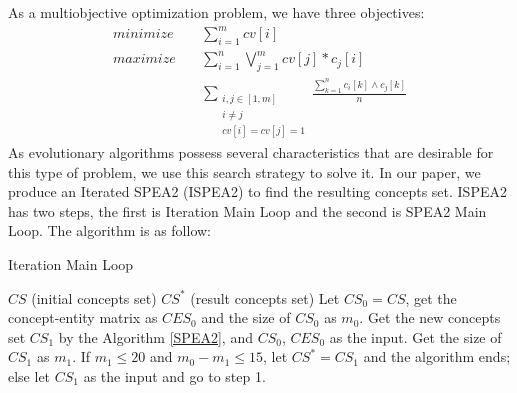 As a multiobjective optimization problem, we have three objectives:
\begin{eqnarray}
minimize\ && \sum_{i=1}^m cv[i]\\
maximize\ && \sum_{i=1}^{n}{\bigvee_{j=1}^{m}{cv[j]*c_{j}[i]}}\\
&& \sum_{\substack{i,j \in [1,m]\\i \neq j\\cv[i] = cv[j] = 1}}{\frac{\sum_{k=1}^n{c_i[k] \wedge c_j[k]}}{n}}
\end{eqnarray}
As evolutionary algorithms possess several characteristics that are desirable for this type of problem\cite{zitzler2004tutorial},
we use this search strategy to solve it.
In our paper, we produce an Iterated SPEA2 (ISPEA2) to find the resulting concepts set. ISPEA2 has two steps, the first is Iteration Main Loop and the second is SPEA2 Main Loop\cite{zitzler2001spea2}. The algorithm is as follow:
\begin{algorithm}
\caption{Iteration Main Loop}
\label{Iteration}
\begin{algorithmic}[1]
\Require
$CS$ (initial concepts set)
\Ensure $CS^*$ (result concepts set)
\State Let $CS_0 = CS$, get the concept-entity matrix as $CES_0$ and the size of $CS_0$ as $m_0$.
\State Get the new concepts set $CS_1$ by the Algorithm \ref{SPEA2}, and $CS_0$, $CES_0$ as the input.
\State Get the size of $CS_1$ as $m_1$. If $m_1 \leq 20$ and $m_0 - m_1 \leq 15$, let $CS^* = CS_1$ and the algorithm ends; else let $CS_1$ as the input and go to step 1.
\end{algorithmic}
\end{algorithm}

